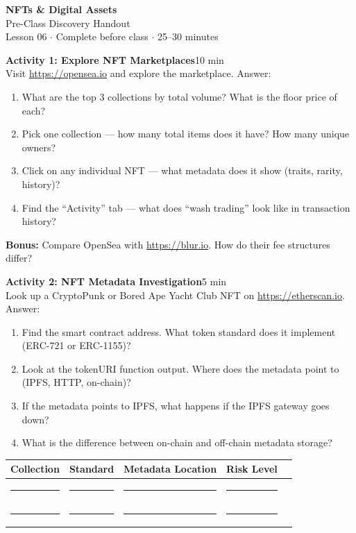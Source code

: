 \documentclass[11pt,a4paper]{article}
\newcommand{\activitybox}[3]{%
  \noindent\colorbox{mllavender4}{\parbox{\dimexpr\linewidth-2\fboxsep}{%
    \textbf{\color{mlpurple}#1}\hfill\textcolor{mlgray}{\small #2}\\[2pt]#3%
  }}\par\vspace{4pt}%
}
\newcommand{\fillcell}{\rule{2.2cm}{0.3pt}}
\begin{document}
\begin{center}
{\LARGE\color{mlpurple}\textbf{NFTs \& Digital Assets}}\\[4pt]
{\large\color{mlblue}Pre-Class Discovery Handout}\\[2pt]
{\small\color{mlgray}Lesson 06 $\cdot$ Complete before class $\cdot$ 25--30 minutes}
\end{center}
\vspace{4pt}

\activitybox{Activity 1: Explore NFT Marketplaces}{10 min}{%
Visit \url{https://opensea.io} and explore the marketplace. Answer:
\begin{enumerate}
\item What are the top 3 collections by total volume? What is the floor price of each?
\item Pick one collection --- how many total items does it have? How many unique owners?
\item Click on any individual NFT --- what metadata does it show (traits, rarity, history)?
\item Find the ``Activity'' tab --- what does ``wash trading'' look like in transaction history?
\end{enumerate}
\textbf{Bonus:} Compare OpenSea with \url{https://blur.io}. How do their fee structures differ?
}

\vspace{2pt}

\activitybox{Activity 2: NFT Metadata Investigation}{5 min}{%
Look up a CryptoPunk or Bored Ape Yacht Club NFT on \url{https://etherscan.io}. Answer:
\begin{enumerate}
\item Find the smart contract address. What token standard does it implement (ERC-721 or ERC-1155)?
\item Look at the tokenURI function output. Where does the metadata point to (IPFS, HTTP, on-chain)?
\item If the metadata points to IPFS, what happens if the IPFS gateway goes down?
\item What is the difference between on-chain and off-chain metadata storage?
\end{enumerate}
\vspace{4pt}
{\footnotesize\renewcommand{\arraystretch}{1.35}%
\setlength{\tabcolsep}{4pt}%
\begin{tabular}{@{}lllll@{}}
\toprule
\textbf{Collection} & \textbf{Standard} & \textbf{Metadata Location} & \textbf{Risk Level} \\
\midrule
\fillcell & \fillcell & \fillcell & \fillcell \\
\fillcell & \fillcell & \fillcell & \fillcell \\
\bottomrule
\end{tabular}}
\vspace{2pt}
}
\end{document}
